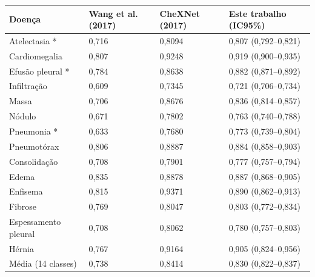 \begin{tabular}{llll}
\toprule
Doença & Wang et al. (2017) & CheXNet (2017) & Este trabalho (IC95\%) \\
\midrule
Atelectasia * & 0,716 & 0,8094 & 0,807 (0,792–0,821) \\
Cardiomegalia & 0,807 & 0,9248 & 0,919 (0,900–0,935) \\
Efusão pleural * & 0,784 & 0,8638 & 0,882 (0,871–0,892) \\
Infiltração & 0,609 & 0,7345 & 0,721 (0,706–0,734) \\
Massa & 0,706 & 0,8676 & 0,836 (0,814–0,857) \\
Nódulo & 0,671 & 0,7802 & 0,763 (0,740–0,788) \\
Pneumonia * & 0,633 & 0,7680 & 0,773 (0,739–0,804) \\
Pneumotórax & 0,806 & 0,8887 & 0,884 (0,858–0,903) \\
Consolidação & 0,708 & 0,7901 & 0,777 (0,757–0,794) \\
Edema & 0,835 & 0,8878 & 0,887 (0,868–0,905) \\
Enfisema & 0,815 & 0,9371 & 0,890 (0,862–0,913) \\
Fibrose & 0,769 & 0,8047 & 0,803 (0,772–0,834) \\
Espessamento pleural & 0,708 & 0,8062 & 0,780 (0,757–0,803) \\
Hérnia & 0,767 & 0,9164 & 0,905 (0,824–0,956) \\
Média (14 classes) & 0,738 & 0,8414 & 0,830 (0,822–0,837) \\
\bottomrule
\end{tabular}
